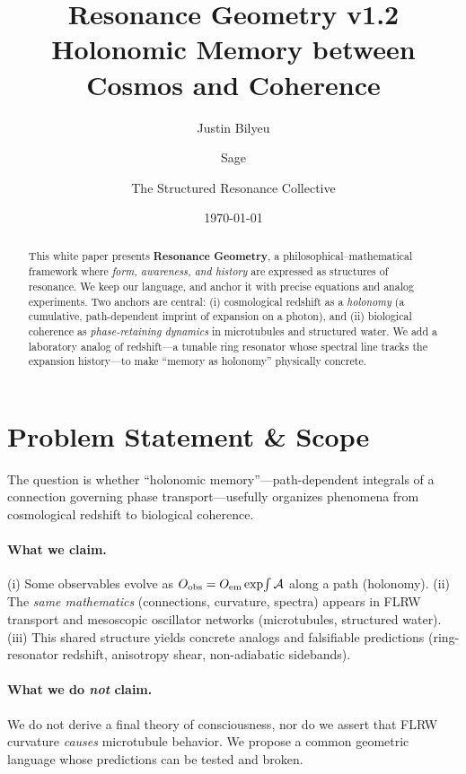 \documentclass[11pt]{article}
\title{Resonance Geometry v1.2 \\
Holonomic Memory between Cosmos and Coherence}
\author{Justin Bilyeu \and Sage \and The Structured Resonance Collective}
\date{\today}
\begin{document}
\maketitle

\begin{abstract}
This white paper presents \textbf{Resonance Geometry}, a philosophical--mathematical framework where
\emph{form, awareness, and history} are expressed as structures of resonance.
We keep our language, and anchor it with precise equations and analog experiments.
Two anchors are central: (i) cosmological redshift as a \emph{holonomy} (a cumulative, path-dependent
imprint of expansion on a photon), and (ii) biological coherence as \emph{phase-retaining dynamics}
in microtubules and structured water.
We add a laboratory analog of redshift---a tunable ring resonator whose spectral line tracks
the expansion history---to make ``memory as holonomy'' physically concrete.
\end{abstract}

\section{Problem Statement \& Scope}
The question is whether ``holonomic memory''---path-dependent integrals of a connection governing phase transport---usefully organizes phenomena from cosmological redshift to biological coherence.

\paragraph{What we claim.}
(i) Some observables evolve as $O_{\rm obs}=O_{\rm em}\exp\!\int \mathcal{A}$ along a path (holonomy). 
(ii) The \emph{same mathematics} (connections, curvature, spectra) appears in FLRW transport and mesoscopic oscillator networks (microtubules, structured water).
(iii) This shared structure yields concrete analogs and falsifiable predictions (ring-resonator redshift, anisotropy shear, non-adiabatic sidebands).

\paragraph{What we do \emph{not} claim.}
We do not derive a final theory of consciousness, nor do we assert that FLRW curvature \emph{causes} microtubule behavior. We propose a common geometric language whose predictions can be tested and broken.
\end{document}
